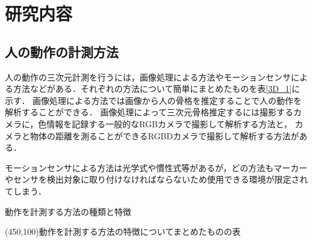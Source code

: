 \documentclass[titlepage]{jarticle}
\begin{document}
%
%
\section{研究内容}

%
%
\subsection{人の動作の計測方法}
%
人の動作の三次元計測を行うには，画像処理による方法やモーションセンサによる方法などがある．それぞれの方法について簡単にまとめたものを表\ref{3D_1}に示す．
画像処理による方法では画像から人の骨格を推定することで人の動作を解析することができる．
画像処理によって三次元骨格推定するには撮影するカメラに，色情報を記録する一般的なRGBカメラで撮影して解析する方法と，
カメラと物体の距離を測ることができるRGBDカメラで撮影して解析する方法がある．

モーションセンサによる方法は光学式や慣性式等があるが，どの方法もマーカーやセンサを検出対象に取り付けなければならないため使用できる環境が限定されてしまう．

\begin{table}[t!]
  \centering
  \caption{動作を計測する方法の種類と特徴}
  \framebox(450,100){動作を計測する方法の特徴についてまとめたものの表}
  \label{3D_1}
\end{table}

\end{document}
